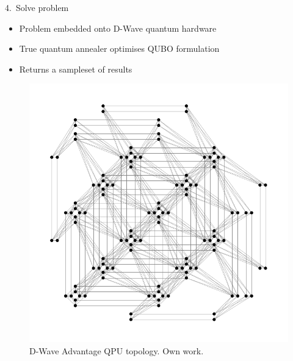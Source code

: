 \documentclass[handout]{beamer}
\begin{document}
\begin{frame}{4.\ Solve problem}

    \begin{itemize}
        \item Problem embedded onto D-Wave quantum hardware
        \item True quantum annealer optimises QUBO formulation
        \item Returns a sampleset of results
    \end{itemize}

    \begin{figure}
        \includegraphics[width=.5\textwidth]{pegasus.pdf}
        \caption{D-Wave Advantage QPU topology. Own work.}
    \end{figure}
\end{frame}
\end{document}
